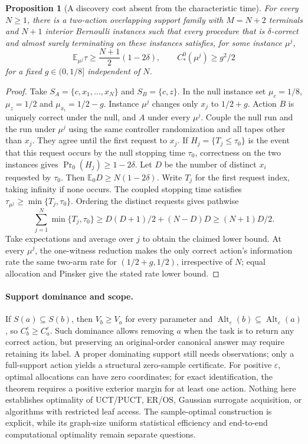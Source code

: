 \documentclass{article}
\theoremstyle{plain}
\newtheorem{proposition}[theorem]{Proposition}
\theoremstyle{definition}
\begin{document}
\begin{proposition}[A discovery cost absent from the characteristic time]
\label{prop:ast-discovery}
For every $N\ge1$, there is a two-action overlapping support family with
$M=N+2$ terminals and $N+1$ interior Bernoulli instances such that every
procedure that is $\delta$-correct and almost surely terminating on these
instances satisfies, for some instance $\mu^j$,
\[
 \mathbb E_{\mu^j}\tau\ge\frac{N+1}{2}(1-2\delta),
 \qquad C_*^0(\mu^j)\ge g^2/2
\]
for a fixed $g\in(0,1/8]$ independent of $N$.
\end{proposition}
\begin{proof}
Take $S_A=\{c,x_1,\ldots,x_N\}$ and $S_B=\{c,z\}$.
In the null instance set $\mu_c=1/8$, $\mu_z=1/2$ and
$\mu_{x_i}=1/2-g$.  Instance $\mu^j$ changes only $x_j$ to $1/2+g$.
Action $B$ is uniquely correct under the null, and $A$ under every
$\mu^j$.  Couple the null run and the run under $\mu^j$ using the same
controller randomization and all tapes other than $x_j$.
They agree until the first request to $x_j$.
If $H_j=\{T_j\le\tau_0\}$ is the event that this request occurs by
the null stopping time $\tau_0$, correctness on the two instances gives
$\Pr_0(H_j)\ge1-2\delta$.
Let $D$ be the number of distinct $x_i$ requested by $\tau_0$.
Then $\mathbb E_0D\ge N(1-2\delta)$.
Write $T_j$ for the first request index, taking infinity if none occurs.
The coupled stopping time satisfies
$\tau_{\mu^j}\ge\min\{T_j,\tau_0\}$.
Ordering the distinct requests gives pathwise
\[
 \sum_{j=1}^N\min\{T_j,\tau_0\}
 \ge D(D+1)/2+(N-D)D\ge(N+1)D/2.
\]
Take expectations and average over $j$ to obtain the claimed lower bound.
At every $\mu^j$, the one-witness reduction makes the only correct action's
information rate the same two-arm rate for $(1/2+g,1/2)$, irrespective of
$N$; equal allocation and Pinsker give the stated rate lower bound.
\end{proof}

\paragraph{Support dominance and scope.}
If $S(a)\subseteq S(b)$, then $V_b\ge V_a$ for every parameter and
$\operatorname{Alt}_\varepsilon(b)\subseteq
\operatorname{Alt}_\varepsilon(a)$, so $C_b^\varepsilon\ge C_a^\varepsilon$.
Such dominance allows removing $a$ when the task is to return any correct
action, but preserving an original-order canonical answer may require
retaining its label.  A proper dominating support still needs observations;
only a full-support action yields a structural zero-sample certificate.
For positive $\varepsilon$, optimal allocations can have zero coordinates;
for exact identification, the theorem requires a positive exterior margin
for at least one action.  Nothing here establishes optimality of UCT/PUCT,
ER/OS, Gaussian surrogate acquisition, or algorithms with restricted leaf
access.  The sample-optimal construction is explicit, while its graph-size
uniform statistical efficiency and end-to-end computational optimality
remain separate questions.
\end{document}

